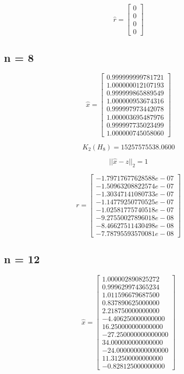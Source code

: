\documentclass[a4paper,12pt]{article}
\begin{document}
$$ \hat{r} = \left[ \begin{array}{c}
		0 \\
		0 \\
		0 \\
		0
              \end{array}
       \right]
$$

\subsection{n = 8}

$$ \hat{x} = \left[ \begin{array}{c}
   0.999999999781721 \\  
   1.000000012107193 \\
   0.999999865889549 \\
   1.000000953674316 \\
   0.999997973442078 \\
   1.000003695487976 \\
   0.999997735023499 \\
   1.000000745058060
              \end{array}
       \right]
$$

$$ K_{2}(H_{8}) = 15257575538.0600$$ 

$$ || \hat{x}-z ||_{2} = 1 $$

$$ \hat{r} = \left[ \begin{array}{c}
  -1.79717677628588e-07 \\
  -1.50963208822574e-07 \\
  -1.30347141080733e-07 \\
  -1.14779250770525e-07 \\
  -1.02581775740518e-07 \\
  -9.27550027896018e-08 \\
  -8.46627511430498e-08 \\
  -7.78795593570081e-08 
              \end{array}
       \right]
$$

\subsection{n = 12}

$$ \hat{x} = \left[ \begin{array}{c}
    1.000002890825272 \\
    0.999629974365234 \\
    1.011596679687500 \\
    0.837890625000000 \\
    2.218750000000000 \\
   -4.406250000000000 \\
   16.250000000000000 \\
  -27.250000000000000 \\
   34.000000000000000 \\
  -24.000000000000000 \\
   11.312500000000000 \\
   -0.828125000000000
              \end{array}
       \right]
$$
\end{document}
